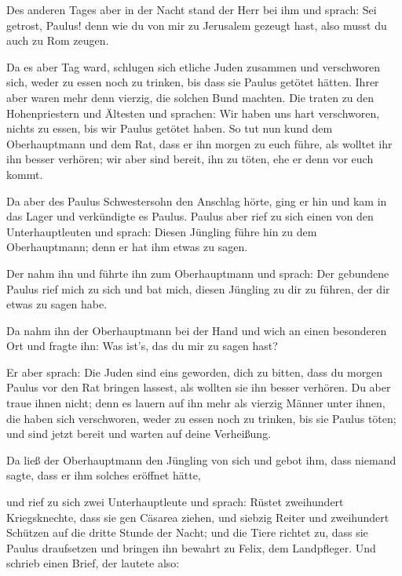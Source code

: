  Des anderen Tages aber in der Nacht stand der Herr bei
ihm und sprach: Sei getrost, Paulus! denn wie du von mir zu Jerusalem
gezeugt hast, also musst du auch zu Rom zeugen.

 Da es aber Tag ward, schlugen sich etliche Juden
zusammen und verschworen sich, weder zu essen noch zu trinken, bis dass
sie Paulus getötet hätten.  Ihrer aber waren mehr denn
vierzig, die solchen Bund machten.  Die traten zu den
Hohenpriestern und Ältesten und sprachen: Wir haben uns hart
verschworen, nichts zu essen, bis wir Paulus getötet haben.
 So tut nun kund dem Oberhauptmann und dem Rat, dass er
ihn morgen zu euch führe, als wolltet ihr ihn besser verhören; wir aber
sind bereit, ihn zu töten, ehe er denn vor euch kommt.

 Da aber des Paulus Schwestersohn den Anschlag hörte,
ging er hin und kam in das Lager und verkündigte es Paulus.
 Paulus aber rief zu sich einen von den Unterhauptleuten
und sprach: Diesen Jüngling führe hin zu dem Oberhauptmann; denn er hat
ihm etwas zu sagen.

 Der nahm ihn und führte ihn zum Oberhauptmann und
sprach: Der gebundene Paulus rief mich zu sich und bat mich, diesen
Jüngling zu dir zu führen, der dir etwas zu sagen habe.

 Da nahm ihn der Oberhauptmann bei der Hand und wich an
einen besonderen Ort und fragte ihn: Was ist's, das du mir zu sagen
hast?

 Er aber sprach: Die Juden sind eins geworden, dich zu
bitten, dass du morgen Paulus vor den Rat bringen lassest, als wollten
sie ihn besser verhören.  Du aber traue ihnen nicht; denn
es lauern auf ihn mehr als vierzig Männer unter ihnen, die haben sich
verschworen, weder zu essen noch zu trinken, bis sie Paulus töten; und
sind jetzt bereit und warten auf deine Verheißung.

 Da ließ der Oberhauptmann den Jüngling von sich und
gebot ihm, dass niemand sagte, dass er ihm solches eröffnet hätte,

 und rief zu sich zwei Unterhauptleute und sprach: Rüstet
zweihundert Kriegsknechte, dass sie gen Cäsarea ziehen, und siebzig
Reiter und zweihundert Schützen auf die dritte Stunde der Nacht;
 und die Tiere richtet zu, dass sie Paulus draufsetzen
und bringen ihn bewahrt zu Felix, dem Landpfleger.  Und
schrieb einen Brief, der lautete also:

